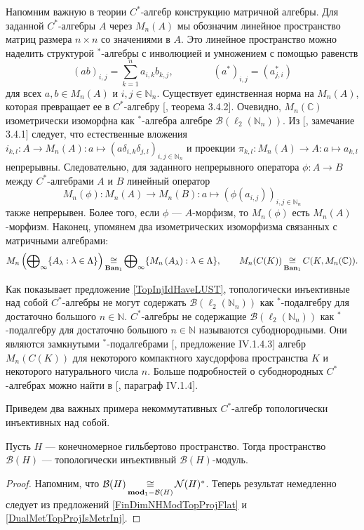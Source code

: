 Напомним важную в теории $C^*$-алгебр конструкцию матричной алгебры.
 Для заданной $C^*$-алгебры $A$ через $M_n(A)$ мы обозначим линейное пространство матриц размера $n\times n$ со значениями в $A$. Это линейное пространство можно наделить структурой ${}^*$-алгебры с инволюцией и умножением с помощью равенств
$$
(ab)_{i,j}=\sum_{k=1}^n a_{i,k}b_{k,j},
\qquad\qquad
(a^*)_{i,j}=(a_{j,i}^*)
$$ 
для всех $a,b\in M_n(A)$ и $i,j\in\mathbb{N}_n$. Существует единственная норма на $M_n(A)$, которая превращает ее в $C^*$-алгебру [\cite{MurphyCStarAlgsAndOpTh}, теорема 3.4.2]. Очевидно, $M_n(\mathbb{C})$ изометрически изоморфна как ${}^*$-алгебра алгебре $\mathcal{B}(\ell_2(\mathbb{N}_n))$. Из [\cite{MurphyCStarAlgsAndOpTh}, замечание 3.4.1] следует, что естественные вложения
$i_{k,l}:A\to M_n(A):a\mapsto(a\delta_{i,k}\delta_{j,l})_{i,j\in\mathbb{N}_n}$ и проекции $\pi_{k,l}:M_n(A)\to A:a\mapsto a_{k,l}$ непрерывны. Следовательно, для заданного непрерывного оператора $\phi:A\to B$ между $C^*$-алгебрами $A$ и $B$ линейный оператор 
$$
M_n(\phi):M_n(A)\to M_n(B):a\mapsto (\phi(a_{i,j}))_{i,j\in\mathbb{N}_n}
$$ 
также непрерывен. Более того, если $\phi$ --- $A$-морфизм, то $M_n(\phi)$ есть $M_n(A)$-морфизм. Наконец, упомянем два изометрических изоморфизма связанных с матричными алгебрами:
$$
M_n\left(\bigoplus\nolimits_\infty\{A_\lambda:\lambda\in\Lambda\}\right)
\mathop{\mathbin{\cong}}\limits_{\mathbf{Ban}_1}
\bigoplus\nolimits_\infty\{M_n\left(A_\lambda\right):\lambda\in\Lambda\},
\qquad
M_n(C(K))\mathop{\mathbin{\cong}}\limits_{\mathbf{Ban}_1}C(K,M_n(\mathbb{C})).
$$

Как показывает предложение \ref{TopInjIdHaveLUST}, топологически инъективные над собой $C^*$-алгебры не могут содержать $\mathcal{B}(\ell_2(\mathbb{N}_n))$ как ${}^*$-подалгебру для достаточно большого $n\in\mathbb{N}$. $C^*$-алгебры не содержащие $\mathcal{B}(\ell_2(\mathbb{N}_n))$ как ${}^*$-подалгебру для достаточно большого $n\in\mathbb{N}$ называются субоднородными. Они являются замкнутыми ${}^*$-подалгебрами [\cite{BlackadarOpAlg}, предложение IV.1.4.3] алгебр $M_n(C(K))$ для некоторого компактного хаусдорфова пространства $K$ и некоторого натурального числа $n$. Больше подробностей о субоднородных $C^*$-алгебрах можно найти в [\cite{BlackadarOpAlg}, параграф IV.1.4]. 

Приведем два важных примера некоммутативных $C^*$-алгебр топологически инъективных над собой.

\begin{proposition}\label{FinDimBHModTopInj} Пусть $H$ --- конечномерное гильбертово пространство. Тогда пространство $\mathcal{B}(H)$ --- топологически инъективный $\mathcal{B}(H)$-модуль. 
\end{proposition}
\begin{proof} Напомним, что $\mathcal{B}(H)\mathop{\mathbin{\cong}}\limits_{\mathbf{mod}_1-\mathcal{B}(H)}\mathcal{N}(H)^*$. Теперь результат немедленно следует из предложений \ref{FinDimNHModTopProjFlat} и \ref{DualMetTopProjIsMetrInj}.
\end{proof}

